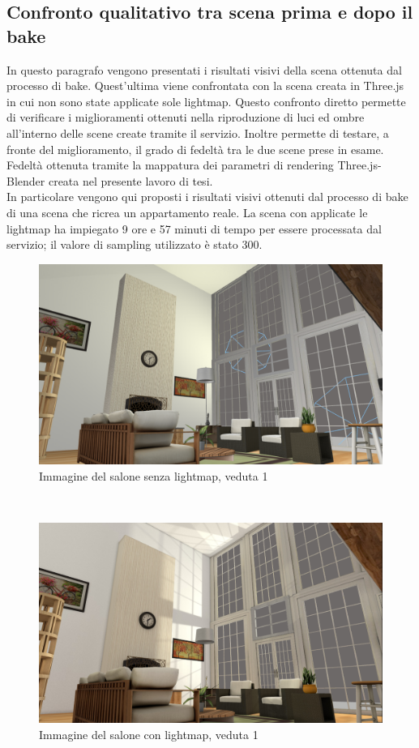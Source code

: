 \subsection{Confronto qualitativo tra scena prima e dopo il bake}
In questo paragrafo vengono presentati i risultati visivi della scena ottenuta dal processo di bake. Quest’ultima viene confrontata con la scena creata in Three.js in cui non sono state applicate sole lightmap.
Questo confronto diretto permette di verificare i miglioramenti ottenuti nella riproduzione di luci ed ombre all’interno delle scene create tramite il servizio.
Inoltre permette di testare, a fronte del miglioramento, il grado di fedeltà tra le due scene prese in esame. Fedeltà ottenuta tramite la mappatura dei parametri di rendering Three.js-Blender creata nel presente lavoro di tesi.
\\
In particolare vengono qui proposti i risultati visivi ottenuti dal processo di bake di una scena che ricrea un appartamento reale.
La scena con applicate le lightmap ha impiegato 9 ore e 57 minuti di tempo per essere processata dal servizio; il valore di sampling utilizzato è stato 300.
\\
\begin{figure}[htb]
 \centering
 \includegraphics[width=0.8\linewidth]{images/chapter_prove_sperimentali/salone_vetrata_nobake.png}\hfill
 \caption[Salone senza lightmap, veduta 1]{Immagine del salone senza lightmap, veduta 1}
 \label{fig:prove_sperimentali_navigatore_vetrata_nobake}
\end{figure}
\\
\begin{figure}[h]
 \centering
 \includegraphics[width=0.8\linewidth]{images/chapter_prove_sperimentali/salone_vetrata_bake.png}\hfill
 \caption[Salone con lightmap, veduta 1]{Immagine del salone con lightmap, veduta 1}
 \label{fig:prove_sperimentali_navigatore_vetrata_bake}
\end{figure}
